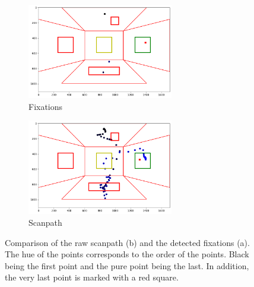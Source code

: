 \begin{figure}
    \begin{subfigure}{1\textwidth}
        \centering
        \includegraphics[width=0.7\textwidth]{images/fixations.png}
        \caption{Fixations}
        \label{fig:fixations}
    \end{subfigure}
    \begin{subfigure}{1\textwidth}
        \centering
        \includegraphics[width=0.7\textwidth]{images/scanpath.png}
        \caption{Scanpath}
        \label{fig:scanpath}
    \end{subfigure}
    \caption{Comparison of the raw scanpath (b) and the detected fixations (a). The hue of the points corresponds to the order of the points. Black being the first point and the pure point being the last. In addition, the very last point is marked with a red square.}
    \label{fig:fixations_scanpath}
\end{figure}


